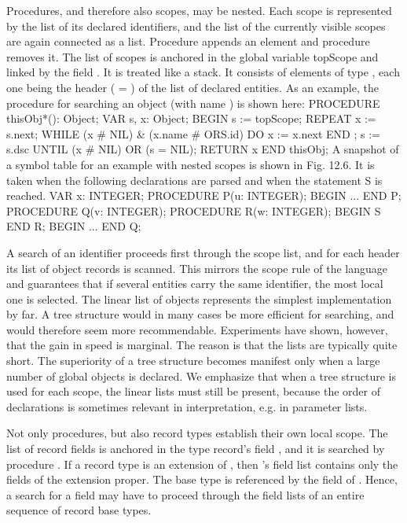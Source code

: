 Procedures, and therefore also scopes, may be nested. Each scope is represented by the list of its declared identifiers, and the list of the currently visible scopes are again connected as a list. Procedure  appends an element and procedure  removes it. The list of scopes is anchored in the global variable topScope and linked by the field . It is treated like a stack. It consists of elements of type , each one being the header ( = ) of the list of declared entities. As an example, the procedure for searching an object (with name ) is shown here:
\begintt
PROCEDURE thisObj*(): Object;
  VAR s, x: Object;
BEGIN
  s := topScope;
  REPEAT x := s.next;
  WHILE (x # NIL) & (x.name # ORS.id)
  DO x := x.next END ;
  s := s.dsc
  UNTIL (x # NIL) OR (s = NIL); RETURN x
END thisObj;
\endtt
A snapshot of a symbol table for an example with nested scopes is shown in Fig. 12.6. It is taken
when the following declarations are parsed and when the statement S is reached.
\begintt
VAR x: INTEGER;
PROCEDURE P(u: INTEGER);
BEGIN ... END P;
PROCEDURE Q(v: INTEGER);
PROCEDURE R(w: INTEGER);
BEGIN S END R;
BEGIN ... END Q;
\endtt


A search of an identifier proceeds first through the scope list, and for each header its list of object records is scanned. This mirrors the scope rule of the language and guarantees that if several entities carry the same identifier, the most local one is selected. The linear list of objects represents the simplest implementation by far. A tree structure would in many cases be more efficient for searching, and would therefore seem more recommendable. Experiments have shown, however, that the gain in speed is marginal. The reason is that the lists are typically quite short. The superiority of a tree structure becomes manifest only when a large number of global objects is declared. We emphasize that when a tree structure is used for each scope, the linear lists must still be present, because the order of declarations is sometimes relevant in interpretation, e.g. in parameter lists.

Not only procedures, but also record types establish their own local scope. The list of record fields is anchored in the type record's field , and it is searched by procedure . If a record type  is an extension of , then 's field list contains only the fields of the extension proper. The base type  is referenced by the  field of . Hence, a search for a field may have to proceed through the field lists of an entire sequence of record base types.

